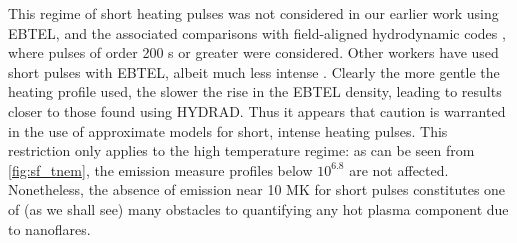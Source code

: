 \documentclass[apj]{emulateapj}
\begin{document}
\par This regime of short heating pulses was not considered in our earlier work using EBTEL, and the associated comparisons with field-aligned hydrodynamic codes \citep{klimchuk_highly_2008,cargill_enthalpy-based_2012}, where pulses of order 200 s or greater were considered. Other workers have used short pulses with EBTEL, albeit much less intense \citep{tajfirouze_euv_2016,tajfirouze_time-resolved_2016}. Clearly the more gentle the heating profile used, the slower the rise in the EBTEL density, leading to results closer to those found using HYDRAD. Thus it appears that caution is warranted in the use of approximate models for short, intense heating pulses. This restriction only applies to the high temperature regime: as can be seen from \autoref{fig:sf_tnem}, the emission measure profiles below $10^{6.8}$ are not affected. Nonetheless, the absence of emission near 10 MK for short pulses constitutes one of (as we shall see) many obstacles to quantifying any hot plasma component due to nanoflares.
\end{document}

